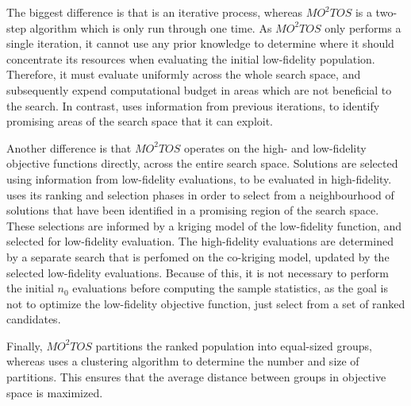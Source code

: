The biggest difference is that \AlgName{} is an iterative process, whereas $MO^2TOS$ is a two-step algorithm which is only run through one time. As $MO^2TOS$ only performs a single iteration, it cannot use any prior knowledge to determine where it should concentrate its resources when evaluating the initial low-fidelity population. Therefore, it must evaluate uniformly across the whole search space, and subsequently expend computational budget in areas which are not beneficial to the search. In contrast, \AlgName{} uses information from previous iterations, to identify promising areas of the search space that it can exploit.

Another difference is that $MO^2TOS$ operates on the high- and low-fidelity objective functions directly, across the entire search space. Solutions are selected using information from low-fidelity evaluations, to be evaluated in high-fidelity. \AlgName{} uses its ranking and selection phases in order to select from a neighbourhood of solutions that have been identified in a promising region of the search space. These selections are informed by a kriging model of the low-fidelity function, and selected for low-fidelity evaluation. The high-fidelity evaluations are determined by a separate search that is perfomed on the co-kriging model, updated by the selected low-fidelity evaluations. Because of this, it is not necessary to perform the initial $n_0$ evaluations before computing the sample statistics, as the goal is not to optimize the low-fidelity objective function, just select from a set of ranked candidates.

Finally, $MO^2TOS$ partitions the ranked population into equal-sized groups, whereas \AlgName{} uses a clustering algorithm to determine the number and size of partitions. This ensures that the average distance between groups in objective space is maximized. 